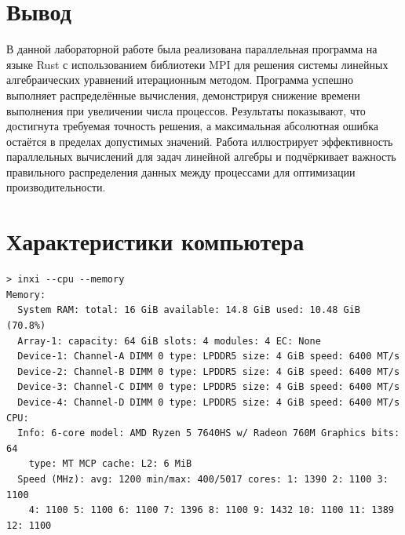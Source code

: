 \documentclass[a4paper, 14pt]{extarticle}
\begin{document}
\section*{Вывод}\label{Sect::conclusion}
В данной лабораторной работе была реализована параллельная программа на языке Rust с использованием библиотеки MPI для решения системы линейных алгебраических уравнений итерационным методом. Программа успешно выполняет распределённые вычисления, демонстрируя снижение времени выполнения при увеличении числа процессов. Результаты показывают, что достигнута требуемая точность решения, а максимальная абсолютная ошибка остаётся в пределах допустимых значений. Работа иллюстрирует эффективность параллельных вычислений для задач линейной алгебры и подчёркивает важность правильного распределения данных между процессами для оптимизации производительности.


\section*{Характеристики компьютера}

\begin{lstlisting}[caption={Характеристики компьютера}, label={lst:computer_specs}]
> inxi --cpu --memory
Memory:
  System RAM: total: 16 GiB available: 14.8 GiB used: 10.48 GiB (70.8%)
  Array-1: capacity: 64 GiB slots: 4 modules: 4 EC: None
  Device-1: Channel-A DIMM 0 type: LPDDR5 size: 4 GiB speed: 6400 MT/s
  Device-2: Channel-B DIMM 0 type: LPDDR5 size: 4 GiB speed: 6400 MT/s
  Device-3: Channel-C DIMM 0 type: LPDDR5 size: 4 GiB speed: 6400 MT/s
  Device-4: Channel-D DIMM 0 type: LPDDR5 size: 4 GiB speed: 6400 MT/s
CPU:
  Info: 6-core model: AMD Ryzen 5 7640HS w/ Radeon 760M Graphics bits: 64
    type: MT MCP cache: L2: 6 MiB
  Speed (MHz): avg: 1200 min/max: 400/5017 cores: 1: 1390 2: 1100 3: 1100
    4: 1100 5: 1100 6: 1100 7: 1396 8: 1100 9: 1432 10: 1100 11: 1389 12: 1100
\end{lstlisting}
\end{document}
